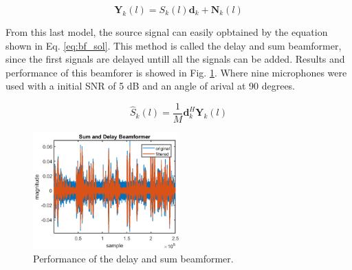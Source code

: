 \begin{equation}
  \mathbf{Y}_{k}(l) = S_{k}(l)\mathbf{d}_{k} + \mathbf{N}_{k}(l)
  \label{eq:bf_model}
\end{equation}

From this last model, the source signal can easily opbtained by the equation shown in Eq. \ref{eq:bf_sol}. This method is called the delay and sum beamformer, since the first signals are delayed untill all the signals can be added. Results and performance of this beamforer is showed in Fig. \ref{fig:bf}. Where nine microphones were used with a initial SNR of 5 dB and an angle of arival at 90 degrees.

\begin{equation}
   \hat S_{k}(l) =\frac{1}{M} \mathbf{d}_{k}^{H}\mathbf{Y}_{k}(l)
  \label{eq:bf_sol}
\end{equation}

\begin{figure}[h]
  \centering
  \includegraphics[width=0.5\textwidth]{images/beamformer_sum_delay.png}
  \caption{Performance of the delay and sum beamformer.}
  \label{fig:bf}
\end{figure}

